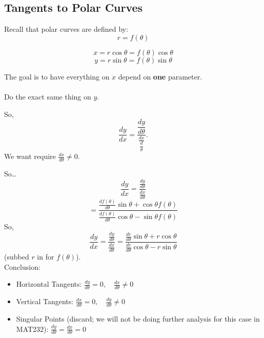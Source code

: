 \documentclass{article}
\begin{document}
\subsection*{Tangents to Polar Curves}
\begin{definitionbox}
\begin{notebox}
Recall that polar curves are defined by:
\[
    r = f(\theta)
\]
\end{notebox}
\[
    x = r\cos\theta = f(\theta) \cos\theta
\]
\[
    y = r\sin\theta = f(\theta) \sin\theta
\]
\begin{intuitionbox}
The goal is to have everything on \( x \) depend on \textbf{one} parameter. \\
\\
Do the exact same thing on \( y \).
\end{intuitionbox}

So, 
\[
    \dfrac{dy}{dx} = \dfrac{\dfrac{dy}{d\theta}}{\frac{dx}{\dfrac{d}{\theta}}}.
\]
We want require \( \frac{dx}{d\theta} \neq 0 \).

So\dots
\[
    \frac{dy}{dx} = \frac{\frac{dy}{d\theta}}{\frac{dx}{d\theta}}
\]
\[
    = \dfrac{\frac{df(\theta)}{d\theta} \sin\theta + \cos\theta f(\theta)}{\frac{df(\theta)}{d\theta} \cos\theta - \sin\theta f(\theta)}
\]
So,
\[
    \frac{dy}{dx} = \frac{\frac{dy}{d\theta}}{\frac{dx}{d\theta}} = \dfrac{\frac{dr}{d\theta} \sin\theta + r \cos\theta}{\frac{dr}{d\theta} \cos\theta - r \sin\theta}
\]
(subbed \( r \) in for \( f(\theta) \)).
\underline
\\
{Conclusion:}
\begin{itemize}
    \item Horizontal Tangents: \( \frac{dy}{d\theta} = 0, \quad \frac{dx}{d\theta} \neq 0 \)
    \item Vertical Tangents: \( \frac{dx}{d\theta} = 0, \quad \frac{dy}{d\theta} \neq 0 \)
    \item Singular Points (discard; we will not be doing further analysis for this case in MAT232): \( \frac{dy}{d\theta} = \frac{dx}{d\theta} = 0 \)
\end{itemize}

\end{definitionbox}
\end{document}
